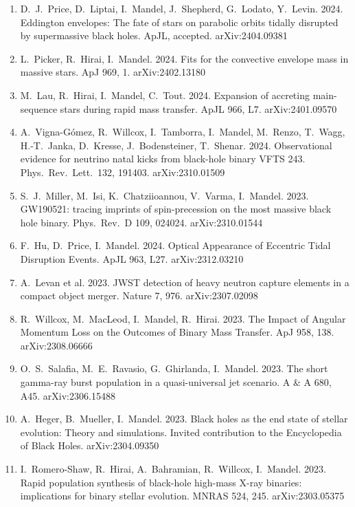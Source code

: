 \documentclass[margin,line]{res}
\begin{document}
\begin{resume}
\begin{enumerate}
\item D.~J.~Price, D.~Liptai, I.~Mandel, J.~Shepherd, G.~Lodato, Y.~Levin.  2024. Eddington envelopes: The fate of stars on parabolic orbits tidally disrupted by supermassive black holes.  ApJL, accepted. arXiv:2404.09381 

\item L.~Picker, R.~Hirai, I.~Mandel. 2024. Fits for the convective envelope mass in massive stars.  ApJ 969, 1.  arXiv:2402.13180

\item M.~Lau, R.~Hirai, I.~Mandel, C.~Tout. 2024. Expansion of accreting main-sequence stars during rapid mass transfer. ApJL 966, L7.  arXiv:2401.09570

\item A.~Vigna-G\'{o}mez, R.~Willcox, I.~Tamborra, I.~Mandel, M.~Renzo, T.~Wagg, H.-T.~Janka, D.~Kresse, J.~Bodensteiner, T.~Shenar. 2024. Observational evidence for neutrino natal kicks from black-hole binary VFTS 243. Phys.~Rev.~Lett.~132, 191403.  arXiv:2310.01509

\item S.~J.~Miller, M.~Isi, K.~Chatziioannou, V.~Varma, I.~Mandel. 2023.  GW190521: tracing imprints of spin-precession on the most massive black hole binary. Phys.~Rev.~D 109, 024024. arXiv:2310.01544

\item F.~Hu, D.~Price, I.~Mandel. 2024. Optical Appearance of Eccentric Tidal Disruption Events. ApJL 963, L27.  arXiv:2312.03210

\item A.~Levan et al. 2023. JWST detection of heavy neutron capture elements in a compact object merger. Nature 7, 976.  arXiv:2307.02098 

\item R.~Willcox, M.~MacLeod, I.~Mandel, R.~Hirai. 2023. The Impact of Angular Momentum Loss on the Outcomes of Binary Mass Transfer.  ApJ 958, 138. arXiv:2308.06666

\item O.~S.~Salafia, M.~E.~Ravasio, G.~Ghirlanda, I.~Mandel.  2023. The short gamma-ray burst population in a quasi-universal jet scenario.  A \& A 680, A45.  arXiv:2306.15488

\item A.~Heger, B.~Mueller, I.~Mandel.  2023.  Black holes as the end state of stellar evolution: Theory and simulations.  Invited contribution to the Encyclopedia of Black Holes. arXiv:2304.09350 

\item I.~Romero-Shaw, R.~Hirai, A.~Bahramian, R.~Willcox, I.~Mandel. 2023. Rapid population synthesis of black-hole high-mass X-ray binaries: implications for binary stellar evolution.  MNRAS 524, 245.  arXiv:2303.05375


\end{enumerate}
\end{resume}
\end{document}
